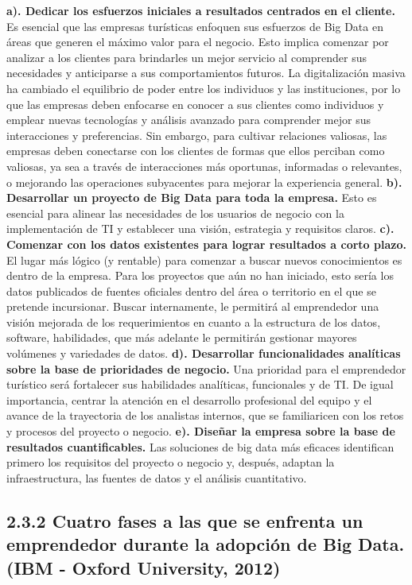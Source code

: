 \documentclass[
  letterpaper,
  DIV=11,
  numbers=noendperiod]{scrreprt}
\begin{document}
\textbf{a). Dedicar los esfuerzos iniciales a resultados centrados en el
cliente.} Es esencial que las empresas turísticas enfoquen sus esfuerzos
de Big Data en áreas que generen el máximo valor para el negocio. Esto
implica comenzar por analizar a los clientes para brindarles un mejor
servicio al comprender sus necesidades y anticiparse a sus
comportamientos futuros. La digitalización masiva ha cambiado el
equilibrio de poder entre los individuos y las instituciones, por lo que
las empresas deben enfocarse en conocer a sus clientes como individuos y
emplear nuevas tecnologías y análisis avanzado para comprender mejor sus
interacciones y preferencias. Sin embargo, para cultivar relaciones
valiosas, las empresas deben conectarse con los clientes de formas que
ellos perciban como valiosas, ya sea a través de interacciones más
oportunas, informadas o relevantes, o mejorando las operaciones
subyacentes para mejorar la experiencia general. \textbf{b). Desarrollar
un proyecto de Big Data para toda la empresa.} Esto es esencial para
alinear las necesidades de los usuarios de negocio con la implementación
de TI y establecer una visión, estrategia y requisitos claros.
\textbf{c). Comenzar con los datos existentes para lograr resultados a
corto plazo.} El lugar más lógico (y rentable) para comenzar a buscar
nuevos conocimientos es dentro de la empresa. Para los proyectos que aún
no han iniciado, esto sería los datos publicados de fuentes oficiales
dentro del área o territorio en el que se pretende incursionar. Buscar
internamente, le permitirá al emprendedor una visión mejorada de los
requerimientos en cuanto a la estructura de los datos, software,
habilidades, que más adelante le permitirán gestionar mayores volúmenes
y variedades de datos. \textbf{d). Desarrollar funcionalidades
analíticas sobre la base de prioridades de negocio.} Una prioridad para
el emprendedor turístico será fortalecer sus habilidades analíticas,
funcionales y de TI. De igual importancia, centrar la atención en el
desarrollo profesional del equipo y el avance de la trayectoria de los
analistas internos, que se familiaricen con los retos y procesos del
proyecto o negocio. \textbf{e). Diseñar la empresa sobre la base de
resultados cuantificables.} Las soluciones de big data más eficaces
identifican primero los requisitos del proyecto o negocio y, después,
adaptan la infraestructura, las fuentes de datos y el análisis
cuantitativo.

\hypertarget{cuatro-fases-a-las-que-se-enfrenta-un-emprendedor-durante-la-adopciuxf3n-de-big-data.-ibm---oxford-university-2012-1}{%
\subsection{2.3.2 Cuatro fases a las que se enfrenta un emprendedor
durante la adopción de Big Data. (IBM - Oxford University,
2012)}\label{cuatro-fases-a-las-que-se-enfrenta-un-emprendedor-durante-la-adopciuxf3n-de-big-data.-ibm---oxford-university-2012-1}}
\end{document}
